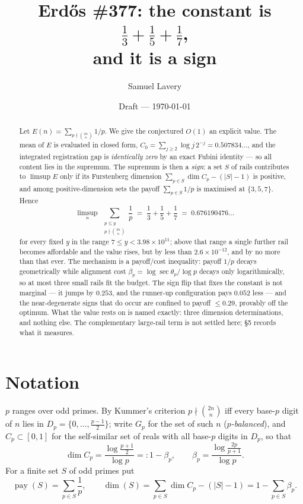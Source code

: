 \documentclass[11pt]{article}
\title{Erd\H{o}s \#377: the constant is $\tfrac13+\tfrac15+\tfrac17$,\\
and it is a sign}
\author{Samuel Lavery}
\date{Draft --- \today}
\begin{document}
\maketitle

\begin{abstract}
Let $E(n)=\sum_{p\nmid\binom{2n}{n}}1/p$.  We give the conjectured $O(1)$ an
explicit value.  The mean of $E$ is evaluated in closed form,
$C_0=\sum_{j\ge2}\log j\,2^{-j}=0.507834\ldots$, and the integrated
registration gap is \emph{identically zero} by an exact Fubini identity --- so
all content lies in the supremum.  The supremum is then a \emph{sign}: a set
$S$ of rails contributes to $\limsup E$ only if its Furstenberg dimension
$\sum_{p\in S}\dim C_p-(|S|-1)$ is positive, and among positive-dimension sets
the payoff $\sum_{p\in S}1/p$ is maximised at $\{3,5,7\}$.  Hence
\[
  \limsup_{n}\ \sum_{\substack{p\le y\\ p\nmid\binom{2n}{n}}}\frac1p
  \;=\;\frac13+\frac15+\frac17\;=\;0.676190476\ldots
\]
for every fixed $y$ in the range $7\le y<3.98\times10^{11}$; above that range a
single further rail becomes affordable and the value rises, but by less than
$2.6\times10^{-12}$, and by no more than that ever.  The mechanism is a
payoff/cost inequality: payoff $1/p$ decays geometrically while alignment cost
$\beta_p=\log\sec\theta_p/\log p$ decays only logarithmically, so at most three
small rails fit the budget.  The sign flip that fixes the constant is not
marginal --- it jumps by $0.253$, and the runner-up configuration pays $0.052$
less --- and the near-degenerate signs that do occur are confined to payoff
$\le0.29$, provably off the optimum.  What the value rests on is named exactly:
three dimension determinations, and nothing else.  The complementary
large-rail term is not settled here; \S5 records what it measures.
\end{abstract}

\section{Notation}

$p$ ranges over odd primes.  By Kummer's criterion $p\nmid\binom{2n}{n}$ iff
every base-$p$ digit of $n$ lies in $D_p=\{0,\dots,\frac{p-1}2\}$; write
$G_p$ for the set of such $n$ (\emph{$p$-balanced}), and $C_p\subset[0,1]$ for
the self-similar set of reals with all base-$p$ digits in $D_p$, so that
\[
  \dim C_p=\frac{\log\frac{p+1}2}{\log p}=:1-\beta_p,
  \qquad
  \beta_p=\frac{\log\frac{2p}{p+1}}{\log p}.
\]
For a finite set $S$ of odd primes put
\[
  \operatorname{pay}(S)=\sum_{p\in S}\frac1p,
  \qquad
  \dim(S)=\sum_{p\in S}\dim C_p-(|S|-1)=1-\sum_{p\in S}\beta_p .
\]
\end{document}
